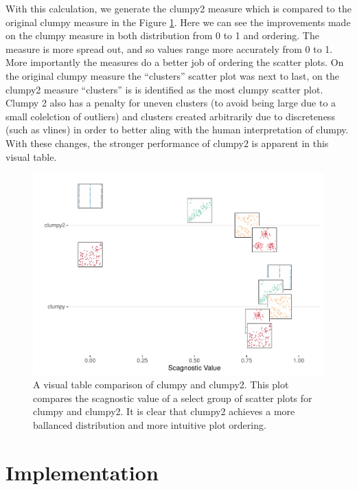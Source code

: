 With this calculation, we generate the clumpy2 measure which is compared
to the original clumpy measure in the Figure \ref{fig:clumpy-vtable}.
Here we can see the improvements made on the clumpy measure in both
distribution from 0 to 1 and ordering. The measure is more spread out,
and so values range more accurately from 0 to 1. More importantly the
measures do a better job of ordering the scatter plots. On the original
clumpy measure the ``clusters'' scatter plot was next to last, on the
clumpy2 measure ``clusters'' is is identified as the most clumpy scatter
plot. Clumpy 2 also has a penalty for uneven clusters (to avoid being
large due to a small colelction of outliers) and clusters created
arbitrarily due to discreteness (such as vlines) in order to better
aling with the human interpretation of clumpy. With these changes, the
stronger performance of clumpy2 is apparent in this visual table.

\begin{Schunk}
\begin{figure}
\includegraphics[width=1\linewidth]{mason-lee-laa-cook_files/figure-latex/clumpy-vtable-1} \caption[A visual table comparison of clumpy and clumpy2]{A visual table comparison of clumpy and clumpy2. This plot compares the scagnostic value of a select group of scatter plots for clumpy and clumpy2. It is clear that clumpy2 achieves a more ballanced distribution and more intuitive plot ordering.}\label{fig:clumpy-vtable}
\end{figure}
\end{Schunk}

\hypertarget{implementation}{%
\section{Implementation}\label{implementation}}

